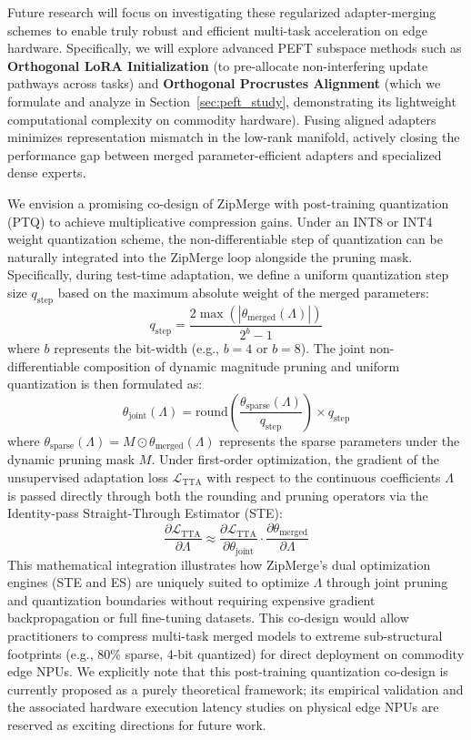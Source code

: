 Future research will focus on investigating these regularized adapter-merging schemes to enable truly robust and efficient multi-task acceleration on edge hardware. Specifically, we will explore advanced PEFT subspace methods such as \textbf{Orthogonal LoRA Initialization} (to pre-allocate non-interfering update pathways across tasks) and \textbf{Orthogonal Procrustes Alignment} (which we formulate and analyze in Section~\ref{sec:peft_study}, demonstrating its lightweight computational complexity on commodity hardware). Fusing aligned adapters minimizes representation mismatch in the low-rank manifold, actively closing the performance gap between merged parameter-efficient adapters and specialized dense experts. 

We envision a promising co-design of ZipMerge with post-training quantization (PTQ) to achieve multiplicative compression gains. Under an INT8 or INT4 weight quantization scheme, the non-differentiable step of quantization can be naturally integrated into the ZipMerge loop alongside the pruning mask. Specifically, during test-time adaptation, we define a uniform quantization step size $q_{\text{step}}$ based on the maximum absolute weight of the merged parameters:
\begin{equation}
    q_{\text{step}} = \frac{2 \max(|\theta_{\text{merged}}(\Lambda)|)}{2^b - 1}
\end{equation}
where $b$ represents the bit-width (e.g., $b=4$ or $b=8$). The joint non-differentiable composition of dynamic magnitude pruning and uniform quantization is then formulated as:
\begin{equation}
    \theta_{\text{joint}}(\Lambda) = \text{round}\left(\frac{\theta_{\text{sparse}}(\Lambda)}{q_{\text{step}}}\right) \times q_{\text{step}}
\end{equation}
where $\theta_{\text{sparse}}(\Lambda) = M \odot \theta_{\text{merged}}(\Lambda)$ represents the sparse parameters under the dynamic pruning mask $M$. Under first-order optimization, the gradient of the unsupervised adaptation loss $\mathcal{L}_{\text{TTA}}$ with respect to the continuous coefficients $\Lambda$ is passed directly through both the rounding and pruning operators via the Identity-pass Straight-Through Estimator (STE):
\begin{equation}
    \frac{\partial \mathcal{L}_{\text{TTA}}}{\partial \Lambda} \approx \frac{\partial \mathcal{L}_{\text{TTA}}}{\partial \theta_{\text{joint}}} \cdot \frac{\partial \theta_{\text{merged}}}{\partial \Lambda}
\end{equation}
This mathematical integration illustrates how ZipMerge's dual optimization engines (STE and ES) are uniquely suited to optimize $\Lambda$ through joint pruning and quantization boundaries without requiring expensive gradient backpropagation or full fine-tuning datasets. This co-design would allow practitioners to compress multi-task merged models to extreme sub-structural footprints (e.g., 80\% sparse, 4-bit quantized) for direct deployment on commodity edge NPUs. We explicitly note that this post-training quantization co-design is currently proposed as a purely theoretical framework; its empirical validation and the associated hardware execution latency studies on physical edge NPUs are reserved as exciting directions for future work.


